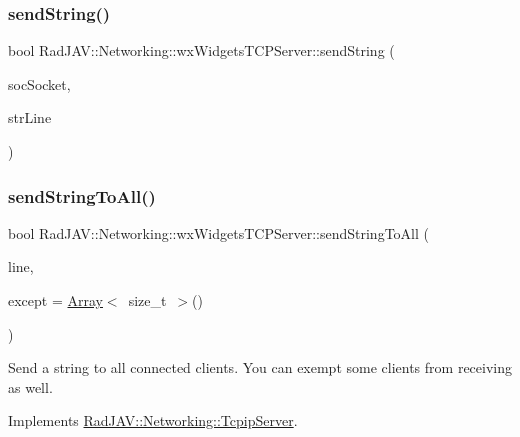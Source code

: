 \subsubsection{\texorpdfstring{send\+String()}{sendString()}}
{\footnotesize\ttfamily bool Rad\+J\+A\+V\+::\+Networking\+::wx\+Widgets\+T\+C\+P\+Server\+::send\+String (\begin{DoxyParamCaption}\item[{wx\+Socket\+Base $\ast$}]{soc\+Socket,  }\item[{\mbox{\hyperlink{class_rad_j_a_v_1_1_string}{String}}}]{str\+Line }\end{DoxyParamCaption})}

\mbox{\label{class_rad_j_a_v_1_1_networking_1_1wx_widgets_t_c_p_server_aeca58079e59ba29af8d74292c4312bc7}} 
\subsubsection{\texorpdfstring{send\+String\+To\+All()}{sendStringToAll()}}
{\footnotesize\ttfamily bool Rad\+J\+A\+V\+::\+Networking\+::wx\+Widgets\+T\+C\+P\+Server\+::send\+String\+To\+All (\begin{DoxyParamCaption}\item[{\mbox{\hyperlink{class_rad_j_a_v_1_1_string}{String}}}]{line,  }\item[{\mbox{\hyperlink{class_rad_j_a_v_1_1_array}{Array}}$<$ size\+\_\+t $>$}]{except = {\ttfamily \mbox{\hyperlink{class_rad_j_a_v_1_1_array}{Array}}$<$~size\+\_\+t~$>$()} }\end{DoxyParamCaption})\hspace{0.3cm}{\ttfamily [virtual]}}

Send a string to all connected clients. You can exempt some clients from receiving as well. 

Implements \mbox{\hyperlink{class_rad_j_a_v_1_1_networking_1_1_tcpip_server_ab5ea43765510f9d8b9e242e676d5b70b}{Rad\+J\+A\+V\+::\+Networking\+::\+Tcpip\+Server}}.

\mbox{\label{class_rad_j_a_v_1_1_networking_1_1wx_widgets_t_c_p_server_adf18ccc8867bb45e801a0ad699e14cbe}} 
